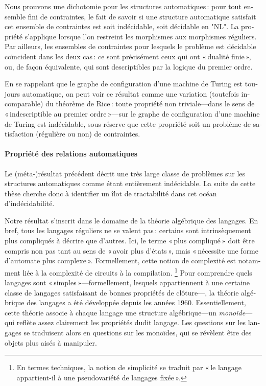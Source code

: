 \begin{french}
\begin{contribution}
	Nous prouvons une dichotomie pour les structures automatiques :
	pour tout ensemble fini de contraintes, le fait de savoir si
	une structure automatique satisfait cet ensemble de contraintes est soit indécidable,
	soit décidable en "NL". La propriété s'applique lorsque l'on restreint
	les morphismes aux morphismes réguliers.
	Par ailleurs, les ensembles de contraintes pour lesquels le problème est décidable
	coïncident dans les deux cas : ce sont précisément ceux qui ont « dualité finie »,
	ou, de façon équivalente, qui sont descriptibles par la logique du premier ordre.
\end{contribution}

En se rappelant que le graphe de configuration d'une machine de Turing est toujours
automatique, on peut voir ce résultat comme une variation (toutefois incomparable)
du théorème de Rice : toute propriété non triviale---dans le sens de
« indescriptible au premier ordre »---sur le graphe de configuration d'une machine de Turing
est indécidable, sous réserve que cette propriété soit un problème
de satisfaction (régulière ou non) de contraintes.

\paragraph*{Propriété des relations automatiques}

Le (méta-)résultat précédent décrit une très large classe de problèmes sur
les structures automatiques comme étant entièrement indécidable.
La suite de cette thèse cherche donc à identifier un îlot de tractabilité
dans cet océan d'indécidabilité.

Notre résultat s'inscrit dans le domaine de la théorie algébrique des langages.
En bref, tous les langages réguliers ne se valent pas : certains sont intrinsèquement
plus compliqués à décrire que d'autres. Ici, le terme « plus compliqué » doit être compris non pas tant au sens de « avoir plus d'états », mais « nécessite une forme d'automate plus complexe ». Formellement, cette notion de complexité
est notamment liée à la complexité de circuits à la compilation.%
\footnote{En termes techniques, la notion de simplicité se traduit par « le langage appartient-il à une pseudovariété de langages fixée ».}
Pour comprendre quels langages sont « simples »---formellement, lesquels appartiennent à une certaine
classe de langages satisfaisant de bonnes propriétés de clôture---, la théorie
algébrique des langages a été développée depuis les années 1960.
Essentiellement, cette théorie associe à chaque langage une structure algébrique---un
\emph{monoïde}---qui reflète assez clairement les propriétés dudit langage.
Les questions sur les langages se traduisent alors en questions sur les monoïdes,
qui se révèlent être des objets plus aisés à manipuler.


\end{french}
